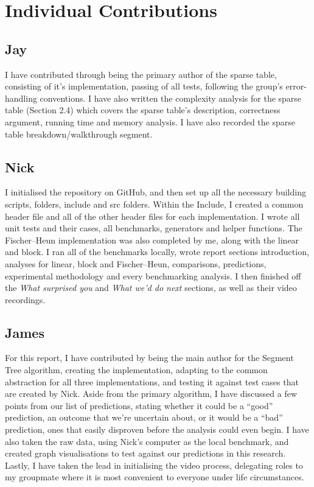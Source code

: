 \documentclass{article}
\theoremstyle{definition}
\begin{document}
\section{Individual Contributions}
\subsection{Jay}
I have contributed through being the primary author of the sparse table, consisting of it's implementation, passing of all tests, following the group's error-handling conventions. I have also written the complexity analysis for the sparse table (Section 2.4) which covers the sparse table's description, correctness argument, running time and memory analysis. I have also recorded the sparse table breakdown/walkthrough segment.

\subsection{Nick}
I initialised the repository on GitHub, and then set up all the necessary building scripts, folders, include and src folders.  Within the Include, I created a common header file and all of the other header files for each implementation. I wrote all unit tests and their cases, all benchmarks, generators and helper functions.  The Fischer--Heun implementation was also completed by me, along with the linear and block.  I ran all of the benchmarks locally, wrote report sections introduction, analyses for linear, block and Fischer--Heun, comparisons, predictions, experimental methodology and every benchmarking analysis.  I then finished off the \textit{What surprised you} and \textit{What we'd do next} sections, as well as their video recordings. 

\subsection{James}
For this report, I have contributed by being the main author for the Segment Tree algorithm, creating the implementation, adapting to the common abstraction for all three implementations, and testing it against test cases that are created by Nick. Aside from the primary algorithm, I have discussed a few points from our list of predictions, stating whether it could be a “good” prediction, an outcome that we’re uncertain about, or it would be a “bad” prediction, ones that easily disproven before the analysis could even begin. I have also taken the raw data, using Nick’s computer as the local benchmark, and created graph visualisations to test against our predictions in this research. Lastly, I have taken the lead in initialising the video process, delegating roles to my groupmate where it is most convenient to everyone under life circumstances.
\end{document}
